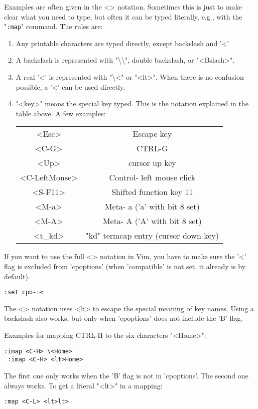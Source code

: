 \begin{description}
\label{<>}
Examples are often given in the <> notation.
Sometimes this is just to make clear what you need to type, but often it can be typed literally, e.g., with the "\verb!:map!" command.
The rules are:
\begin{enumerate}
				\item Any printable characters are typed directly, except backslash and '<'
				\item A backslash is represented with "\textbackslash\textbackslash", double backslash, or "<Bslash>".
				\item A real '<' is represented with "\textbackslash<" or "<lt>".  When there is no
								confusion possible, a '<' can be used directly.
				\item "<key>" means the special key typed.  This is the notation explained in
								the table above.  A few examples:
								\begin{center}
												\begin{tabular}{c c}
																<Esc> & Escape key\\
																<C-G> & CTRL-G\\
																<Up> & cursor up key\\
																<C-LeftMouse> & Control- left mouse click\\
																<S-F11> & Shifted function key 11\\
																<M-a> & Meta- a  ('a' with bit 8 set)\\
																<M-A> & Meta- A  ('A' with bit 8 set)\\
																<t\_kd> & "kd" termcap entry (cursor down key)\\
												\end{tabular}
								\end{center}
\end{enumerate}
\end{description}

If you want to use the full <> notation in Vim, you have to make sure the '<' flag is excluded from 'cpoptions' (when 'compatible' is not set, it already is by default).
\begin{Verbatim}[samepage=true]
 :set cpo-=<
\end{Verbatim}
The <> notation uses <lt> to escape the special meaning of key names.
Using a backslash also works, but only when 'cpoptions' does not include the 'B' flag.

Examples for mapping CTRL-H to the six characters "<Home>":
\begin{Verbatim}[samepage=true]
 :imap <C-H> \<Home>
 :imap <C-H> <lt>Home>
\end{Verbatim}
The first one only works when the 'B' flag is not in 'cpoptions'.
The second one always works.
To get a literal "<lt>" in a mapping:
\begin{Verbatim}[samepage=true]
 :map <C-L> <lt>lt>
\end{Verbatim}

